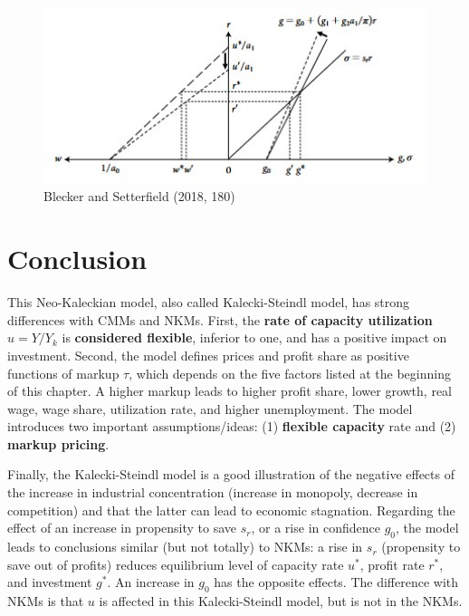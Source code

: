 \documentclass[
  letterpaper,
  DIV=11,
  numbers=noendperiod]{scrreprt}
\begin{document}
\begin{figure}

{\centering \includegraphics[width=4.75in,height=\textheight]{images/kaleckisteindl2.jpg}

}

\caption{Blecker and Setterfield (2018, 180)}

\end{figure}

\hypertarget{conclusion}{%
\section{Conclusion}\label{conclusion}}

This Neo-Kaleckian model, also called Kalecki-Steindl model, has strong
differences with CMMs and NKMs. First, the \textbf{rate of capacity
utilization} \(u = Y/Y_k\) is \textbf{considered flexible}, inferior to
one, and has a positive impact on investment. Second, the model defines
prices and profit share as positive functions of markup \(\tau\), which
depends on the five factors listed at the beginning of this chapter. A
higher markup leads to higher profit share, lower growth, real wage,
wage share, utilization rate, and higher unemployment. The model
introduces two important assumptions/ideas: (1) \textbf{flexible
capacity} rate and (2) \textbf{markup pricing}.

Finally, the Kalecki-Steindl model is a good illustration of the
negative effects of the increase in industrial concentration (increase
in monopoly, decrease in competition) and that the latter can lead to
economic stagnation. Regarding the effect of an increase in propensity
to save \(s_r\), or a rise in confidence \(g_0\), the model leads to
conclusions similar (but not totally) to NKMs: a rise in \(s_r\)
(propensity to save out of profits) reduces equilibrium level of
capacity rate \(u^*\), profit rate \(r^*\), and investment \(g^*\). An
increase in \(g_0\) has the opposite effects. The difference with NKMs
is that \(u\) is affected in this Kalecki-Steindl model, but is not in
the NKMs.
\end{document}
